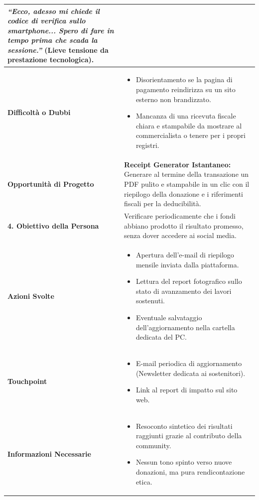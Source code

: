 \documentclass[11pt,a4paper]{article}
\begin{document}
\begin{table}[h!]
\begin{tabular}{|p{3.2cm}|p{11.8cm}|}
\textit{``Ecco, adesso mi chiede il codice di verifica sullo smartphone... Spero di fare in tempo prima che scada la sessione.''} (Lieve tensione da prestazione tecnologica). \\ \hline
\textbf{Difficoltà o Dubbi} &
\begin{itemize}[leftmargin=*,nosep]
    \item Disorientamento se la pagina di pagamento reindirizza su un sito esterno non brandizzato.
    \item Mancanza di una ricevuta fiscale chiara e stampabile da mostrare al commercialista o tenere per i propri registri.
\end{itemize} \\ \hline
\textbf{Opportunità di Progetto} &
\textbf{Receipt Generator Istantaneo:} Generare al termine della transazione un PDF pulito e stampabile in un clic con il riepilogo della donazione e i riferimenti fiscali per la deducibilità. \\ \hline
\hline
\textbf{4. Obiettivo della Persona} & Verificare periodicamente che i fondi abbiano prodotto il risultato promesso, senza dover accedere ai social media. \\ \hline
\textbf{Azioni Svolte} &
\begin{itemize}[leftmargin=*,nosep]
    \item Apertura dell'e-mail di riepilogo mensile inviata dalla piattaforma.
    \item Lettura del report fotografico sullo stato di avanzamento dei lavori sostenuti.
    \item Eventuale salvataggio dell'aggiornamento nella cartella dedicata del PC.
\end{itemize} \\ \hline
\textbf{Touchpoint} &
\begin{itemize}[leftmargin=*,nosep]
    \item E-mail periodica di aggiornamento (Newsletter dedicata ai sostenitori).
    \item Link al report di impatto sul sito web.
\end{itemize} \\ \hline
\textbf{Informazioni Necessarie} &
\begin{itemize}[leftmargin=*,nosep]
    \item Resoconto sintetico dei risultati raggiunti grazie al contributo della community.
    \item Nessun tono spinto verso nuove donazioni, ma pura rendicontazione etica.
\end{itemize} \\ \hline

\end{tabular}
\end{table}
\end{document}
